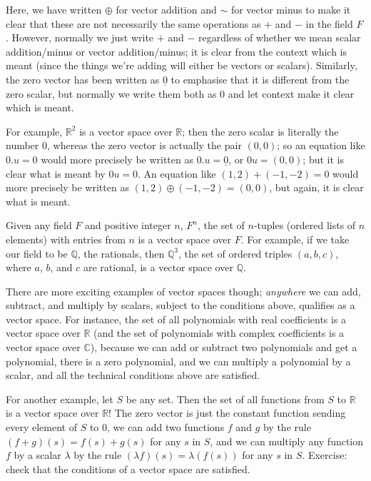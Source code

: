 \documentclass{article}
\let\uline\underline
\begin{document}
Here, we have written $\oplus$ for vector addition and $\sim$ for vector minus to make it clear that these are not necessarily the same operations as $+$ and $-$ in the field $F$. However, normally we just write $+$ and $-$ regardless of whether we mean scalar addition/minus or vector addition/minus; it is clear from the context which is meant (since the things we're adding will either be vectors or scalars). Similarly, the zero vector has been written as $\uline{0}$ to emphasise that it is different from the zero scalar, but normally we write them both as 0 and let context make it clear which is meant.

For example, $\mathbb{R}^2$ is a vector space over $\mathbb{R}$; then the zero scalar is literally the number 0, whereas the zero vector is actually the pair $(0,0)$; so an equation like $0.u=0$ would more precisely be written as $0.u=\uline{0}$, or $0u=(0,0)$; but it is clear what is meant by $0u=0$. An equation like $(1,2)+(-1,-2)=0$ would more precisely be written as $(1,2) \oplus (-1,-2)=(0,0)$, but again, it is clear what is meant.

Given any field $F$ and positive integer $n$, $F^n$, the set of $n$-tuples (ordered lists of $n$ elements) with entries from $n$ is a vector space over $F$. For example, if we take our field to be $\mathbb{Q}$, the rationals, then $\mathbb{Q}^3$, the set of ordered triples $(a,b,c)$, where $a$, $b$, and $c$ are rational, is a vector space over $\mathbb{Q}$.

There are more exciting examples of vector spaces though; \textit{anywhere} we can add, subtract, and multiply by scalars, subject to the conditions above, qualifies as a vector space. For instance, the set of all polynomials with real coefficients is a vector space over $\mathbb{R}$ (and the set of polynomials with complex coefficients is a vector space over $\mathbb{C}$), because we can add or subtract two polynomials and get a polynomial, there is a zero polynomial, and we can multiply a polynomial by a scalar, and all the technical conditions above are satisfied.

For another example, let $S$ be any set. Then the set of all functions from $S$ to $\mathbb{R}$ is a vector space over $\mathbb{R}$! The zero vector is just the constant function sending every element of $S$ to 0, we can add two functions $f$ and $g$ by the rule $(f+g)(s)=f(s)+g(s)$ for any $s$ in $S$, and we can multiply any function $f$ by a scalar $\lambda$ by the rule $(\lambda f)(s)=\lambda(f(s))$ for any $s$ in $S$. Exercise: check that the conditions of a vector space are satisfied.
\end{document}
